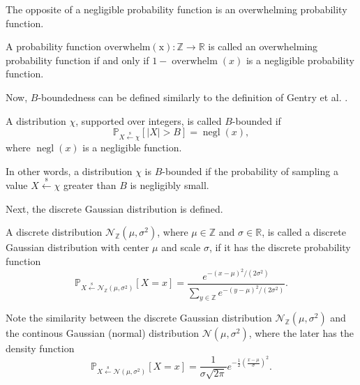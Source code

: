 The opposite of a negligible probability function is an overwhelming probability function.
\begin{definition}
    A probability function \linebreak $\operatorname{overwhelm(x)}: \mathbb{Z} \to \mathbb{R}$ is called an overwhelming probability function if and only if $1-\operatorname{overwhelm}(x)$ is a negligible probability function. 
\end{definition}

Now, $B$-boundedness can be defined similarly to the definition of Gentry et al. \cite{cite:gsw}.
\begin{definition}[$B$-boundedness]
    A distribution $\chi$, supported over integers, is called $B$-bounded if
    $$\mathbb{P}_{X \xleftarrow{\text{s}} \chi}[|X| > B] = \operatorname{negl}(x),$$
    where $\operatorname{negl}(x)$ is a negligible function.
\end{definition}
In other words, a distribution $\chi$ is $B$-bounded if the probability of sampling a value $X \xleftarrow{\text{s}} \chi$ greater than $B$ is negligibly small.

Next, the discrete Gaussian distribution \cite{cite:discrete_gaussian} is defined.
\begin{definition}
    A discrete distribution $\mathcal{N}_{\mathbb{Z}}(\mu, \sigma^2)$, where $\mu \in \mathbb{Z}$ and $\sigma \in \mathbb{R}$, is called a discrete Gaussian distribution with center $\mu$ and scale $\sigma$, if it has the discrete probability function
    $$\mathbb{P}_{X \xleftarrow{\text{s}} \mathcal{N}_{\mathbb{Z}}(\mu, \sigma^2)}[X=x] = \frac{e^{-(x-\mu)^2/(2\sigma^2)}}{ \sum_{y \in \mathbb{Z}} e^{-(y-\mu)^2/(2\sigma^2)} }.$$
\end{definition}
Note the similarity between the discrete Gaussian distribution $\mathcal{N}_{\mathbb{Z}}(\mu, \sigma^2)$ and the continous Gaussian (normal) distribution $\mathcal{N}(\mu, \sigma^2)$, where the later has the density function
$$ \mathbb{P}_{X \xleftarrow{\text{s}} \mathcal{N}(\mu, \sigma^2)}[X=x] = \frac{1}{\sigma \sqrt{2 \pi}}e^{-\frac{1}{2} (\frac{x-\mu}{\sigma})^2}.$$


